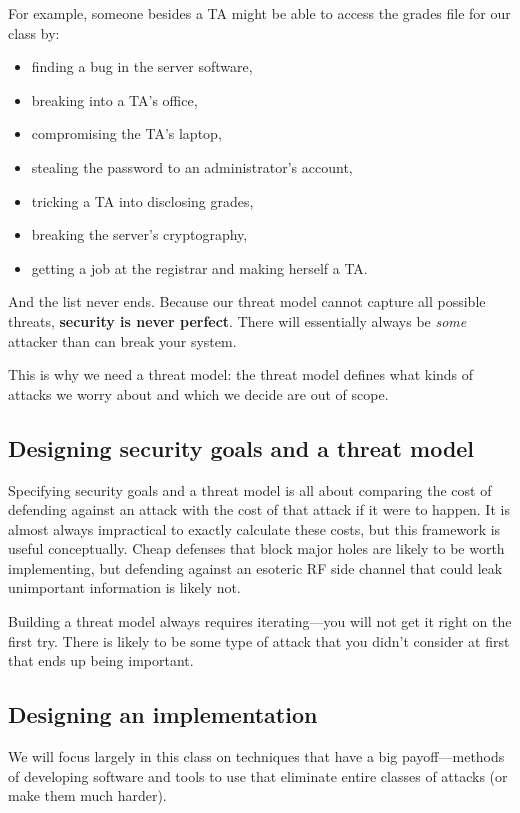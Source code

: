 For example, someone besides a TA might be able to
access the grades file for our class by:
\begin{itemize}
	\item finding a bug in the server software,
	\item breaking into a TA's office,
  \item compromising the TA's laptop,
	\item stealing the password to an administrator's account,
	\item tricking a TA into disclosing grades,
	\item breaking the server's cryptography,
	\item getting a job at the registrar and making herself a TA.
\end{itemize}

And the list never ends. Because our threat model cannot capture all
possible threats, \textbf{security is never perfect}.
There will essentially always be \textit{some} attacker than can break your system.

This is why we need a threat model: the threat
model defines what kinds of attacks we worry about
and which we decide are out of scope.

\subsection{Designing security goals and a threat model}
Specifying security goals and
a threat model is all about comparing
the cost of defending against an attack with the
cost of that attack if it were to happen.
It is almost always impractical to exactly calculate
these costs, but this framework is useful
conceptually.
Cheap defenses that block major
holes are likely to be worth implementing, but
defending against an esoteric RF side channel that
could leak unimportant information is likely not.

Building a threat model always requires iterating---you will not get it right on the first try.
There is likely to be some type of attack that you didn't consider at first that ends up being important.

\subsection{Designing an implementation}
We will focus largely in this class on techniques
that have a big payoff---methods of developing
software and tools to use that eliminate entire
classes of attacks (or make them much harder). 

